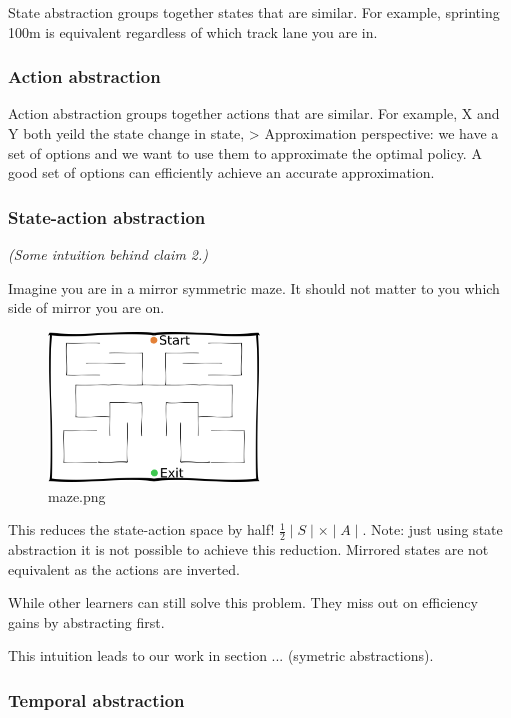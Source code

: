 State abstraction groups together states that are similar. For example,
sprinting 100m is equivalent regardless of which track lane you are in.

\subsubsection{Action abstraction}

Action abstraction groups together actions that are similar. For
example, X and Y both yeild the state change in state, \textgreater{}
Approximation perspective: we have a set of options and we want to use
them to approximate the optimal policy. A good set of options can
efficiently achieve an accurate approximation.

\subsubsection{State-action abstraction}

\emph{(Some intuition behind claim 2.)}

Imagine you are in a mirror symmetric maze. It should not matter to you
which side of mirror you are on.

\begin{figure}
\centering
\includegraphics[width=0.5\textwidth,height=0.5\textheight]{../../pictures/drawings/maze.png}
\caption{maze.png}
\end{figure}

This reduces the state-action space by half!
\(\frac{1}{2}\mid S \mid \times \mid A \mid\). Note: just using state
abstraction it is not possible to achieve this reduction. Mirrored
states are not equivalent as the actions are inverted.

While other learners can still solve this problem. They miss out on
efficiency gains by abstracting first.

This intuition leads to our work in section ... (symetric abstractions).

\subsubsection{Temporal abstraction}

